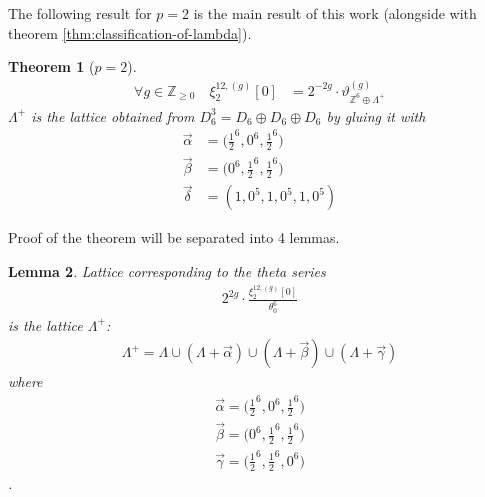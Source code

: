 \documentclass{article}
\newcommand{\ZZ}{\mathbb{Z}}
\newcommand{\de}{\delta}
\theoremstyle{plain}
\newtheorem{theorem}{Theorem}[section]
\newtheorem{lemma}[theorem]{Lemma}
\theoremstyle{definition}
\begin{document}
    The following result for $p=2$ is the main result of this work
    (alongside with theorem \ref{thm:classification-of-lambda}).
    \begin{theorem}[$p=2$]\label{thm:p-2}
        \begin{align}
            \forall g \in\mathbb{Z}_{\geq 0} \quad \xi_2^{12, (g)}[0] &= 2^{-2g} \cdot \vartheta^{(g)}_{\ZZ^6 \oplus \Lambda^+}
        \end{align}
        $\Lambda^+$ is the lattice obtained from $D_6^3=D_6\oplus D_6 \oplus D_6$
        by gluing it with
        \begin{align}
            \vec{\alpha} &= \Big(\frac{1}{2}^6, 0^6, \frac{1}{2}^6 \Big) \\
            \vec{\beta} &= \Big(0^6, \frac{1}{2}^6, \frac{1}{2}^6 \Big) \\
            {\vec{\de}} &= ( 1, 0^5, 1, 0^5, 1, 0^5 )
        \end{align}
    \end{theorem}
    Proof of the theorem will be separated into 4 lemmas.
    \begin{lemma}
        Lattice corresponding to the theta series
        \begin{align}
            2^{2g} \cdot \frac{\xi_2^{12, (g)}[0]}{\theta_0^6}
        \end{align}
        is
        the lattice $\Lambda^+$:
        \begin{align}
            \Lambda^+ = 
            \Lambda \cup (\Lambda + \vec{\alpha}) \cup (\Lambda + \vec{\beta}) \cup (\Lambda + \vec{\gamma})
        \end{align}
        where 
        \begin{align}
            \vec{\alpha}=\big(\frac{1}{2}^6, 0^6, \frac{1}{2}^6 \big) \\
            \vec{\beta}=\big(0^6, \frac{1}{2}^6, \frac{1}{2}^6\big) \\
            \vec{\gamma}=\big(\frac{1}{2}^6, \frac{1}{2}^6, 0^6\big)
        \end{align}.
    \end{lemma}
\end{document}
